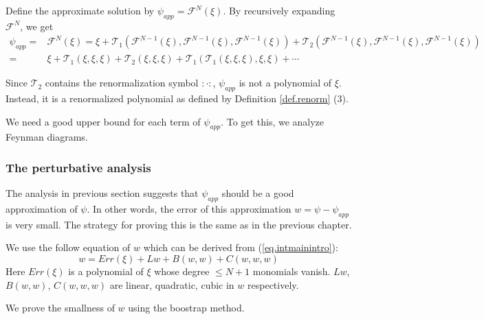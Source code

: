 
Define the approximate solution by $\psi_{app}=\mathcal{F}^{N}(\xi)$. By recursively expanding $\mathcal{F}^{N}$, we get 
\begin{equation*}
\begin{split}
 \psi_{app}=&\mathcal{F}^{N}(\xi)=\xi+\mathcal{T}_1(\mathcal{F}^{N-1}(\xi),\mathcal{F}^{N-1}(\xi),\mathcal{F}^{N-1}(\xi)) + \mathcal{T}_2(\mathcal{F}^{N-1}(\xi),\mathcal{F}^{N-1}(\xi),\mathcal{F}^{N-1}(\xi))
 \\
 =&\xi+\mathcal{T}_1(\xi,\xi,\xi)+ \mathcal{T}_2(\xi,\xi,\xi) +\mathcal{T}_1(\mathcal{T}_1(\xi,\xi,\xi),\xi,\xi)
 +\cdots
\end{split} 
\end{equation*}

Since $\mathcal{T}_2$ contains the renormalization symbol $:\cdot:$, $\psi_{app}$ is not a polynomial of $\xi$. Instead, it is a renormalized polynomial as defined by Definition \ref{def.renorm} (3).

We need a good upper bound for each term of $\psi_{app}$. To get this, we analyze Feynman diagrams. 

\subsubsection{The perturbative analysis}\label{sec.pert intro} The analysis in previous section suggests that $\psi_{app}$ should be a good approximation of $\psi$. In other words, the error of this approximation $w=\psi-\psi_{app}$ is very small. The strategy for proving this is the same as in the previous chapter.

We use the follow equation of $w$ which can be derived from (\ref{eq.intmainintro}):
\begin{equation}\label{eq.eqwintro}
 w= Err(\xi)+Lw+B(w,w)+C(w,w,w)
\end{equation}
Here $Err(\xi)$ is a polynomial of $\xi$ whose degree $\le N+1$ monomials vanish. $Lw$, $B(w,w)$, $C(w,w,w)$ are linear, quadratic, cubic in $w$ respectively.

We prove the smallness of $w$ using the boostrap method.

